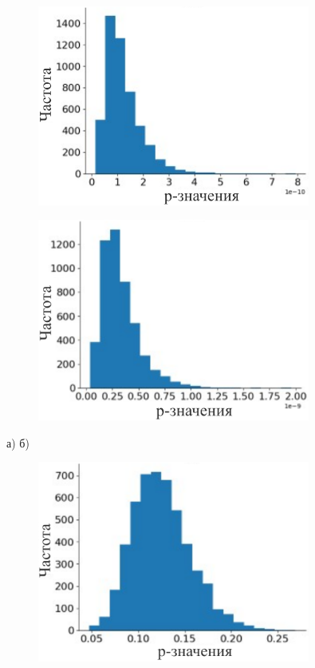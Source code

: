\begin{figure}[H]
	\centering
	\includegraphics[width=0.8\textwidth]{media/ict/image4}
	\caption*{}
\end{figure}

\begin{figure}[H]
	\centering
	\includegraphics[width=0.8\textwidth]{media/ict/image5}
	\caption*{}
\end{figure}


а) б)


\begin{figure}[H]
	\centering
	\includegraphics[width=0.8\textwidth]{media/ict/image6}
	\caption*{}
\end{figure}


